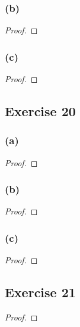 \documentclass[14pt]{extarticle}
\begin{document}
\subsubsection{(b)}

\begin{proof}

\end{proof}

\subsubsection{(c)}

\begin{proof}

\end{proof}

\subsection{Exercise 20}

\subsubsection{(a)}

\begin{proof}

\end{proof}

\subsubsection{(b)}

\begin{proof}

\end{proof}

\subsubsection{(c)}

\begin{proof}

\end{proof}

\subsection{Exercise 21}

\begin{proof}

\end{proof}
\end{document}
